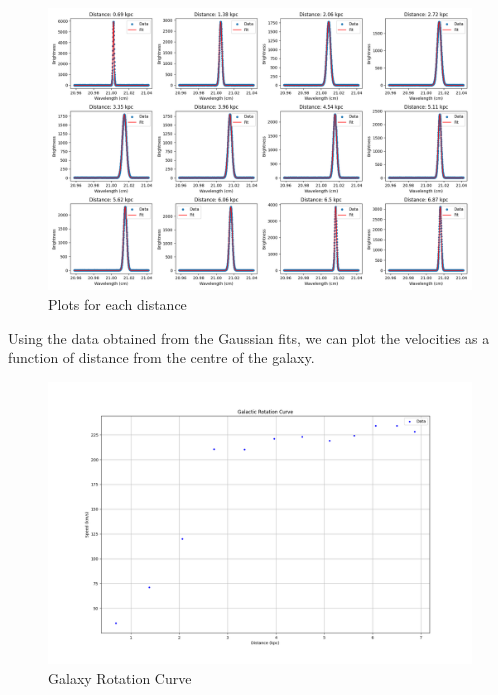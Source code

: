 \begin{figure}[H]
	\centering
	\includegraphics[width=\textwidth]{Images/12_files.png}
	\caption{Plots for each distance}
	\label{fig:12_files}
\end{figure}

Using the data obtained from the Gaussian fits, we can plot the velocities as a function of distance from the centre of the galaxy. 

\begin{figure}[H]
	\centering
	\includegraphics[width=\textwidth]{Images/galaxy_rotation_curve.png}
	\caption{Galaxy Rotation Curve}
	\label{fig:galaxy_rotation_curve}
\end{figure}